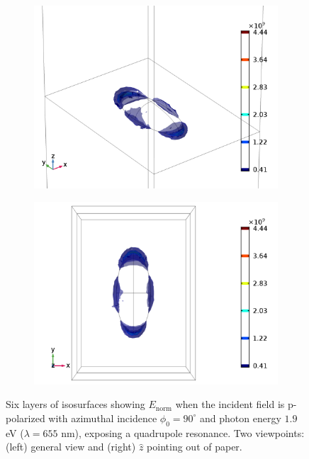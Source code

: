 \begin{figure}
    \begin{subfigure}{0.49\textwidth}
        \centering
        \includegraphics[width=\linewidth]{figures/ch4/S5B/fielddistr/s5b_normE_TM_wl655_phi90_view_legend1.png}
    \end{subfigure}
    \begin{subfigure}{0.49\textwidth}
        \centering
        \includegraphics[width=\linewidth]{figures/ch4/S5B/fielddistr/s5b_normE_TM_wl655_phi90_zview_legend.png}
    \end{subfigure}
    \caption{Six layers of isosurfaces showing $E_\text{norm}$ when the incident field is p-polarized with azimuthal incidence $\phi_0=90^\circ$ and photon energy $1.9$ eV ($\lambda=655$ nm), exposing a quadrupole resonance. Two viewpoints: (left) general view and (right) $\hat{z}$ pointing out of paper.}
    \label{fig:S5B_fielddistr_multipole}
\end{figure}
